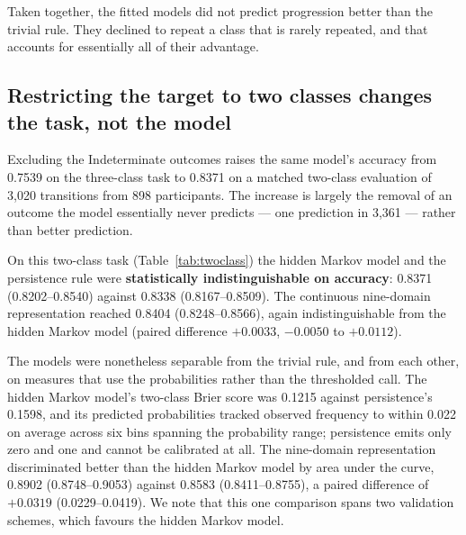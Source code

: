 \documentclass[journal]{IEEEtran}
\begin{document}
Taken together, the fitted models did not predict progression better than the
trivial rule. They declined to repeat a class that is rarely repeated, and that
accounts for essentially all of their advantage.

\subsection{Restricting the target to two classes changes the task, not the model}

Excluding the Indeterminate outcomes raises the same model's accuracy from
0.7539 on the three-class task to 0.8371 on a matched two-class evaluation of
3,020 transitions from 898 participants. The increase is largely the removal of
an outcome the model essentially never predicts --- one prediction in 3,361 ---
rather than better prediction.

On this two-class task (Table~\ref{tab:twoclass}) the hidden Markov model and
the persistence rule were \textbf{statistically indistinguishable on accuracy}:
0.8371 (0.8202--0.8540) against 0.8338 (0.8167--0.8509). The continuous
nine-domain representation reached 0.8404 (0.8248--0.8566), again
indistinguishable from the hidden Markov model (paired difference $+0.0033$,
$-0.0050$ to $+0.0112$).

\begin{table}[!t]
\centering
\caption{Two-class (TD vs.\ PIGD) prediction on 3,020 matched transitions from
898 participants. Intervals are patient-level cluster bootstraps.
$^{\dagger}$The persistence rule emits only zero and one, so its log loss is
clipped and it cannot be calibrated at all.}
\label{tab:twoclass}
\small

\end{table}

The models were nonetheless separable from the trivial rule, and from each
other, on measures that use the probabilities rather than the thresholded call.
The hidden Markov model's two-class Brier score was 0.1215 against persistence's
0.1598, and its predicted probabilities tracked observed frequency to within
0.022 on average across six bins spanning the probability range; persistence
emits only zero and one and cannot be calibrated at all. The nine-domain
representation discriminated better than the hidden Markov model by area under
the curve, 0.8902 (0.8748--0.9053) against 0.8583 (0.8411--0.8755), a paired
difference of $+0.0319$ (0.0229--0.0419). We note that this one comparison
spans two validation schemes, which favours the hidden Markov model.
\end{document}
